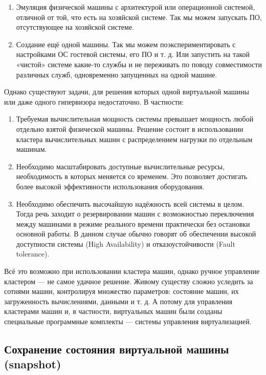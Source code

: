 \documentclass[14pt, a4paper]{article}
\begin{document}
\begin{enumerate}
    \item Эмуляция физической машины с архитектурой или операционной системой, отличной от той,
    что есть на хозяйской системе. Так мы можем запускать ПО, отсутствующее на хозяйской
    системе.
    \item Создание ещё одной машины. Так мы можем поэкспериментировать с настройками ОС
    гостевой системы, его ПО и т. д. Или запустить на такой «чистой» системе какие-то службы и
    не переживать по поводу совместимости различных служб, одновременно запущенных на
    одной машине.
\end{enumerate}

Однако существуют задачи, для решения которых одной виртуальной машины или даже одного
гипервизора недостаточно. В частности:

\begin{enumerate}
    \item Требуемая вычислительная мощность системы превышает мощность любой отдельно взятой
    физической машины. Решение состоит в использовании кластера вычислительных машин с
    распределением нагрузки по отдельным машинам.
    \item Необходимо масштабировать доступные вычислительные ресурсы, необходимость в которых
    меняется со временем. Это позволяет достигать более высокой эффективности
    использования оборудования.
    \item Необходимо обеспечить высочайшую надёжность всей системы в целом. Тогда речь заходит о
    резервировании машин с возможностью переключения между машинами в режиме реального
    времени практически без остановки основной работы. В данном случае обычно говорят об
    обеспечении высокой доступности системы (High Availability) и отказоустойчивости (Fault
    tolerance).
\end{enumerate}

Всё это возможно при использовании кластера машин, однако ручное управление кластером — не
самое удачное решение. Живому существу сложно уследить за сотнями машин, контролируя
множество параметров: состояние машин, их загруженность вычислениями, данными и т. д. А потому
для управления кластерами машин и, в частности, виртуальных машин были созданы специальные
программные комплекты — системы управления виртуализацией.

\subsection*{Сохранение состояния виртуальной машины (snapshot)} 
\end{document}
